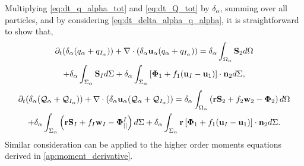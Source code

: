 Multiplying \ref{eq:dt_q_alpha_tot} and \ref{eq:dt_Q_tot} by $\delta_\alpha$, summing over all particles, and by considering \ref{eq:dt_delta_alpha_q_alpha}, it is straightforward to show that,
\begin{multline}
    \partial_t (\delta_\alpha (q_\alpha+q_{I_\alpha}))
    + \mathbf{\nabla} \cdot (\delta_\alpha\textbf{u}_\alpha(q_\alpha+q_{I_\alpha}))
    = \delta_\alpha\int_{\Omega_\alpha} \textbf{S}_2 d\Omega\\
    + \delta_\alpha\int_{\Sigma_\alpha} \textbf{S}_I d\Sigma
    + \delta_\alpha\int_{\Sigma_\alpha} \left[\mathbf{\Phi}_1 + f_1 (\textbf{u}_I-\textbf{u}_1) \right] \cdot \textbf{n}_2 d\Sigma,
    \label{eq:dt_dq_alpha_tot}
\end{multline}
\begin{multline}
    \partial_t (\delta_\alpha (\mathcal{Q}_\alpha+\mathcal{Q}_{I_\alpha}))
    + \mathbf{\nabla} \cdot (\delta_\alpha\textbf{u}_\alpha(\mathcal{Q}_\alpha+\mathcal{Q}_{I_\alpha}))
    = \delta_\alpha\int_{\Omega_\alpha} \left(
        \textbf{r} \textbf{S}_2         
        + f_2  \textbf{w}_2 
        - \mathbf{\Phi}_2
    \right) d\Omega\\
    + \delta_\alpha\int_{\Sigma_\alpha} \left(
        \textbf{r}\textbf{S}_I
        + f_I \textbf{w}_I
        - \mathbf{\Phi}_{||}^I
    \right) d\Sigma
    + \delta_\alpha\int_{\Sigma_\alpha} \textbf{r} \left[
        \mathbf{\Phi}_1
        + f_1 (\textbf{u}_I-\textbf{u}_1)
    \right]\cdot \textbf{n}_2  d\Sigma.
    \label{eq:dt_dQ_alpha_tot}
\end{multline}
Similar consideration can be applied to the higher order moments equations derived in \ref{ap:moment_derivative}.

